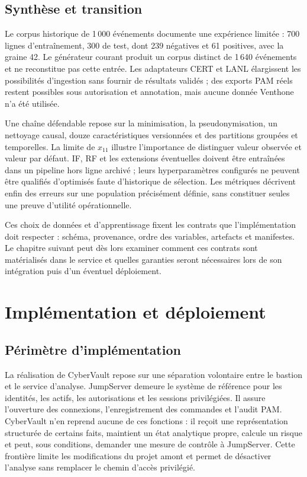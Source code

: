 \documentclass[11pt,a4paper,oneside]{report}
\theoremstyle{definition}
\theoremstyle{plain}
\begin{document}
\section{Synthèse et transition}

Le corpus historique de 1\,000 événements documente une expérience limitée :
700 lignes d'entraînement, 300 de test, dont 239 négatives et 61 positives, avec
la graine 42. Le générateur courant produit un corpus distinct de 1\,640
événements et ne reconstitue pas cette entrée. Les adaptateurs CERT et LANL
élargissent les possibilités d'ingestion sans fournir de résultats validés ;
des exports PAM réels restent possibles sous autorisation et annotation, mais
aucune donnée Venthone n'a été utilisée.

Une chaîne défendable repose sur la minimisation, la pseudonymisation, un
nettoyage causal, douze caractéristiques versionnées et des partitions
groupées et temporelles. La limite de $x_{11}$ illustre l'importance de
distinguer valeur observée et valeur par défaut. IF, RF et les extensions
éventuelles doivent être entraînées dans un pipeline hors ligne archivé ; leurs
hyperparamètres configurés ne peuvent être qualifiés d'optimisés faute
d'historique de sélection. Les métriques décrivent enfin des erreurs sur une
population précisément définie, sans constituer seules une preuve d'utilité
opérationnelle.

Ces choix de données et d'apprentissage fixent les contrats que l'implémentation
doit respecter : schéma, provenance, ordre des variables, artefacts et
manifestes. Le chapitre suivant peut dès lors examiner comment ces contrats
sont matérialisés dans le service et quelles garanties seront nécessaires lors
de son intégration puis d'un éventuel déploiement.

\chapter{Implémentation et déploiement}
\label{chap:deployment}

\section{Périmètre d'implémentation}

La réalisation de CyberVault repose sur une séparation volontaire entre le
bastion et le service d'analyse. JumpServer demeure le système de référence
pour les identités, les actifs, les autorisations et les sessions
privilégiées. Il assure l'ouverture des connexions, l'enregistrement des
commandes et l'audit PAM. CyberVault n'en reprend aucune de ces fonctions :
il reçoit une représentation structurée de certains faits, maintient un état
analytique propre, calcule un risque et peut, sous conditions, demander une
mesure de contrôle à JumpServer. Cette frontière limite les modifications du
projet amont et permet de désactiver l'analyse sans remplacer le chemin
d'accès privilégié.
\end{document}
